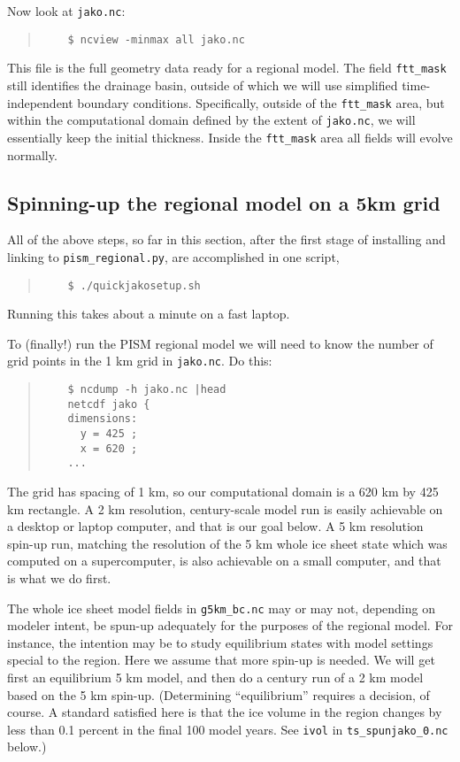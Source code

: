 Now look at \verb|jako.nc|:
\begin{quote}\small
\begin{verbatim}
    $ ncview -minmax all jako.nc
\end{verbatim}
\normalsize\end{quote}
This file is the full geometry data ready for a regional model.  The field \verb|ftt_mask| still identifies the drainage basin, outside of which we will use simplified time-independent boundary conditions.  Specifically, outside of the \verb|ftt_mask| area, but within the computational domain defined by the extent of \verb|jako.nc|, we will essentially keep the initial thickness.  Inside the \verb|ftt_mask| area all fields will evolve normally.

\subsection*{Spinning-up the regional model on a 5km grid}
All of the above steps, so far in this section, after the first stage of installing and linking to \verb|pism_regional.py|, are accomplished in one script,
\begin{quote}\small
\begin{verbatim}
    $ ./quickjakosetup.sh
\end{verbatim}
\normalsize\end{quote}
Running this takes about a minute on a fast laptop.

To (finally!) run the PISM regional model we will need to know the number of grid points in the 1 km grid in \verb|jako.nc|.  Do this:
\begin{quote}\small
\begin{verbatim}
    $ ncdump -h jako.nc |head
    netcdf jako {
    dimensions:
	  y = 425 ;
	  x = 620 ;
	...
\end{verbatim}
\normalsize\end{quote}
The grid has spacing of 1 km, so our computational domain is a 620 km by 425 km rectangle.  A 2 km resolution, century-scale model run is easily achievable on a desktop or laptop computer, and that is our goal below.  A 5 km resolution spin-up run, matching the resolution of the 5 km whole ice sheet state which was computed on a supercomputer, is also achievable on a small computer, and that is what we do first.

The whole ice sheet model fields in \verb|g5km_bc.nc| may or may not, depending on modeler intent, be spun-up adequately for the purposes of the regional model.  For instance, the intention may be to study equilibrium states with model settings special to the region.  Here we assume that more spin-up is needed.  We will get first an equilibrium 5 km model, and then do a century run of a 2 km model based on the 5 km spin-up.  (Determining ``equilibrium'' requires a decision, of course.  A standard satisfied here is that the ice volume in the region changes by less than 0.1 percent in the final 100 model years.  See \verb|ivol| in \verb|ts_spunjako_0.nc| below.)


